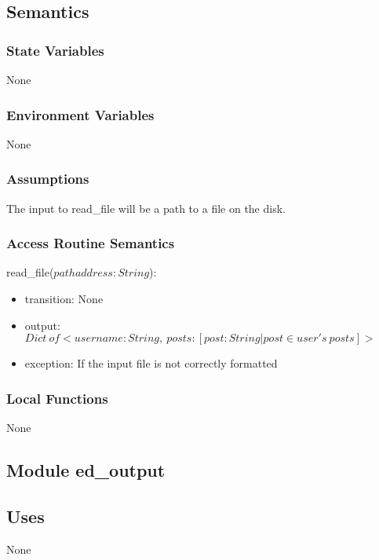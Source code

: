 \documentclass[12pt, titlepage]{article}
\begin{document}
\subsection{Semantics}

\subsubsection{State Variables}

None

\subsubsection{Environment Variables}

None

\subsubsection{Assumptions}

The input to read\_file will be a path to a file on the disk.

\subsubsection{Access Routine Semantics}

\noindent read\_file($pathaddress: String$):
\begin{itemize}
\item transition: None
\item output: $Dict\ of <username: String,\ posts: [post : String \vert post \in user's\ posts]>$
\item exception: If the input file is not correctly formatted
\end{itemize}

\subsubsection{Local Functions}

None


\subsection{Module ed\_output}

\subsection{Uses}

None
\end{document}
